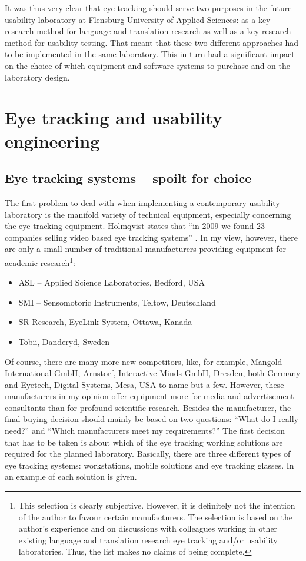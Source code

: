 \documentclass[output=paper]{langsci/langscibook}
\begin{document}
It was thus very clear that eye tracking should serve two purposes in the future usability laboratory at Flensburg University of Applied Sciences: as a key research method for language and translation research as well as a key research method for usability testing. That meant that these two different approaches had to be implemented in the same laboratory. This in turn had a significant impact on the choice of which equipment and software systems to purchase and on the laboratory design.


\section{Eye tracking and usability engineering }

\subsection{Eye tracking systems -- spoilt for choice }

The first problem to deal with when implementing a contemporary usability laboratory is the manifold variety of technical equipment, especially concerning the eye tracking equipment. Holmqvist states that ``in 2009 we found 23 companies selling video based eye tracking systems'' \citep[12]{Holmqvist2011}. In my view, however, there are only a small number of traditional manufacturers providing equipment for academic research\footnote{ This selection is clearly subjective. However, it is definitely not the intention of the author to favour certain manufacturers. The selection is based on the author's experience and on discussions with colleagues working in other existing language and translation research eye tracking and/or usability laboratories. Thus, the list makes no claims of being complete.}: 

\begin{itemize}
\item ASL -- Applied Science Laboratories, Bedford, USA
\item SMI -- Sensomotoric Instruments, Teltow, Deutschland
\item SR-Research, EyeLink System, Ottawa, Kanada
\item Tobii, Danderyd, Sweden 
\end{itemize}


Of course, there are many more new competitors, like, for example, Mangold International GmbH, Arnstorf, Interactive Minds GmbH, Dresden, both Germany and Eyetech, Digital Systems, Mesa, USA to name but a few. However, these manufacturers in my opinion offer equipment more for media and advertisement consultants than for profound scientific research. Besides the manufacturer, the final buying decision should mainly be based on two questions: ``What do I really need?'' and ``Which manufacturers meet my requirements?'' The first decision that has to be taken is about which of the eye tracking working solutions are required for the planned laboratory. Basically, there are three different types of eye tracking systems: workstations, mobile solutions and eye tracking glasses. In  an example of each solution is given.
\end{document}
